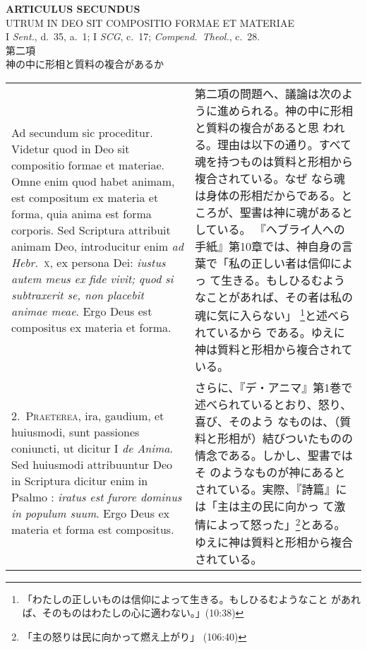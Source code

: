 \documentclass[10pt]{jsarticle} %
\begin{document}
\newpage
{}

\begin{center}
 {\Large {\bf ARTICULUS SECUNDUS}}\\
 {\large UTRUM IN DEO SIT COMPOSITIO FORMAE ET MATERIAE}\\
 {\footnotesize I \textit{Sent.}, d.~35, a.~1; I \textit{SCG}, c.~17;
 \textit{Compend.~Theol.}, c.~28.}\\
 {\Large 第二項\\神の中に形相と質料の複合があるか}
\end{center}

\begin{longtable}{p{21em}p{21em}}

{\huge A}{\sc d secundum sic proceditur}. Videtur quod in Deo sit
compositio formae et materiae. Omne enim quod habet animam, est
compositum ex materia et forma, quia anima est forma corporis. Sed
Scriptura attribuit animam Deo, introducitur enim \textit{ad
Hebr.}~\textsc{x}, ex persona Dei: \textit{iustus autem meus ex fide
vivit; quod si subtraxerit se, non placebit animae meae}. Ergo Deus est
compositus ex materia et forma.


& 

第二項の問題へ、議論は次のように進められる。神の中に形相と質料の複合があると思
われる。理由は以下の通り。すべて魂を持つものは質料と形相から複合されている。なぜ
なら魂は身体の形相だからである。ところが、聖書は神に魂があるとしている。
『ヘブライ人への手紙』第10章では、神自身の言葉で「私の正しい者は信仰によっ
て生きる。もしひるむようなことがあれば、その者は私の魂に気に入らない」
\footnote{「わたしの正しいものは信仰によって生きる。もしひるむようなこと
があれば、そのものはわたしの心に適わない。」(10:38)}と述べられているから
である。ゆえに神は質料と形相から複合されている。


\\


2.~\textsc{Praeterea}, ira, gaudium, et huiusmodi, sunt passiones
 coniuncti, ut dicitur I \textit{de Anima}. Sed huiusmodi attribuuntur Deo in
 Scriptura dicitur enim in Psalmo : \textit{iratus est furore dominus in populum
 suum}. Ergo Deus ex materia et forma est compositus.

& さらに、『デ・アニマ』第1巻で述べられているとおり、怒り、喜び、そのよう
なものは、（質料と形相が）結びついたものの情念である。しかし、聖書ではそ
のようなものが神にあるとされている。実際、『詩篇』には「主は主の民に向かっ
て激情によって怒った」\footnote{「主の怒りは民に向かって燃え上がり」
(106:40)}とある。ゆえに神は質料と形相から複合されている。


\end{longtable}
\end{document}
